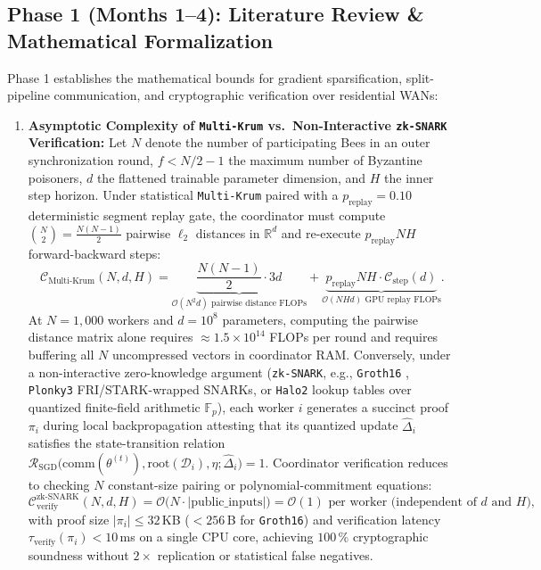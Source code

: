 \documentclass[11pt,a4paper]{article}
\begin{document}
\subsection{Phase 1 (Months 1--4): Literature Review \& Mathematical Formalization}
\label{sec:roadmap_phase1}

Phase 1 establishes the mathematical bounds for gradient sparsification, split-pipeline communication, and cryptographic verification over residential WANs:

\begin{enumerate}[leftmargin=1.8em]
    \item \textbf{Asymptotic Complexity of \texttt{Multi-Krum} vs.\ Non-Interactive \texttt{zk-SNARK} Verification:}
    Let $N$ denote the number of participating Bees in an outer synchronization round, $f < N/2 - 1$ the maximum number of Byzantine poisoners, $d$ the flattened trainable parameter dimension, and $H$ the inner step horizon. Under statistical \texttt{Multi-Krum} \cite{blanchard2017krum} paired with a $p_{\text{replay}} = 0.10$ deterministic segment replay gate, the coordinator must compute $\binom{N}{2} = \frac{N(N-1)}{2}$ pairwise $\ell_2$ distances in $\mathbb{R}^d$ and re-execute $p_{\text{replay}} N H$ forward-backward steps:
    \begin{equation}
        \mathcal{C}_{\text{Multi-Krum}}(N, d, H) = \underbrace{\frac{N(N-1)}{2} \cdot 3d}_{\mathcal{O}(N^2 d)\text{ pairwise distance FLOPs}} + \underbrace{p_{\text{replay}} N H \cdot \mathcal{C}_{\text{step}}(d)}_{\mathcal{O}(N H d)\text{ GPU replay FLOPs}}.
    \end{equation}
    At $N = 1{,}000$ workers and $d = 10^8$ parameters, computing the pairwise distance matrix alone requires $\approx 1.5 \times 10^{14}$ FLOPs per round and requires buffering all $N$ uncompressed vectors in coordinator RAM. Conversely, under a non-interactive zero-knowledge argument (\texttt{zk-SNARK}, e.g., \texttt{Groth16} \cite{groth2016size}, \texttt{Plonky3} FRI/STARK-wrapped SNARKs, or \texttt{Halo2} lookup tables over quantized finite-field arithmetic $\mathbb{F}_p$), each worker $i$ generates a succinct proof $\pi_i$ during local backpropagation attesting that its quantized update $\hat{\Delta}_i$ satisfies the state-transition relation $\mathcal{R}_{\text{SGD}}\big(\text{comm}(\theta^{(t)}), \text{root}(\mathcal{D}_i), \eta; \hat{\Delta}_i\big) = 1$. Coordinator verification reduces to checking $N$ constant-size pairing or polynomial-commitment equations:
    \begin{equation}
        \mathcal{C}_{\text{verify}}^{\text{zk-SNARK}}(N, d, H) = \mathcal{O}\big(N \cdot |\text{public\_inputs}|\big) = \mathcal{O}(1) \text{ per worker (independent of } d \text{ and } H\text{)},
    \end{equation}
    with proof size $|\pi_i| \le 32$\,KB ($< 256$\,B for \texttt{Groth16}) and verification latency $\tau_{\text{verify}}(\pi_i) < 10$\,ms on a single CPU core, achieving $100\,\%$ cryptographic soundness without $2\times$ replication or statistical false negatives.


\end{enumerate}
\end{document}
